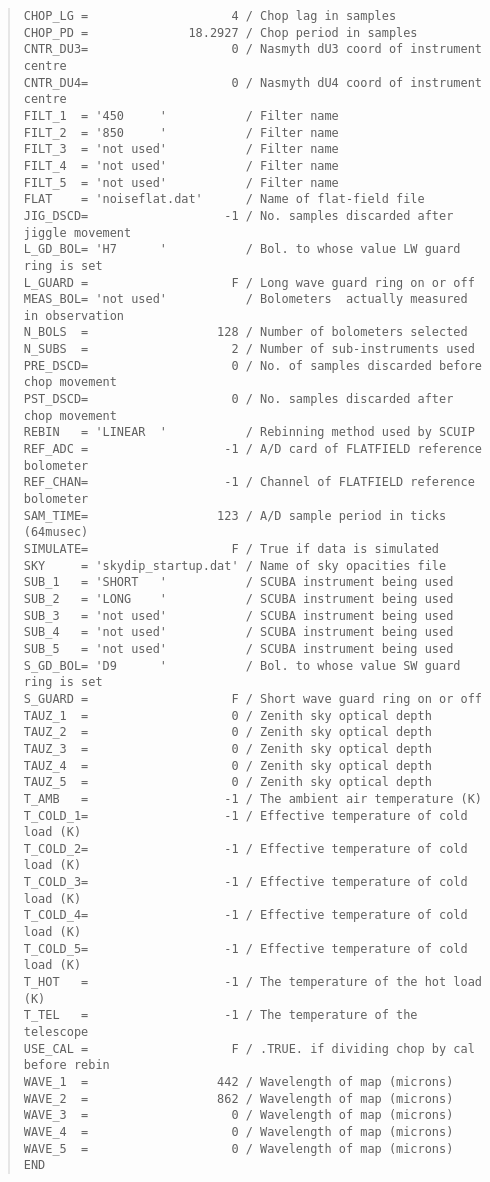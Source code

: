 \documentclass[twoside,11pt]{article}
\newenvironment{myquote}{\begin{quote}\begin{small}}{\end{small}\end{quote}}
\begin{document}
\begin{myquote}
\begin{verbatim}
CHOP_LG =                    4 / Chop lag in samples
CHOP_PD =              18.2927 / Chop period in samples
CNTR_DU3=                    0 / Nasmyth dU3 coord of instrument centre
CNTR_DU4=                    0 / Nasmyth dU4 coord of instrument centre
FILT_1  = '450     '           / Filter name
FILT_2  = '850     '           / Filter name
FILT_3  = 'not used'           / Filter name
FILT_4  = 'not used'           / Filter name
FILT_5  = 'not used'           / Filter name
FLAT    = 'noiseflat.dat'      / Name of flat-field file
JIG_DSCD=                   -1 / No. samples discarded after jiggle movement
L_GD_BOL= 'H7      '           / Bol. to whose value LW guard ring is set
L_GUARD =                    F / Long wave guard ring on or off
MEAS_BOL= 'not used'           / Bolometers  actually measured in observation
N_BOLS  =                  128 / Number of bolometers selected
N_SUBS  =                    2 / Number of sub-instruments used
PRE_DSCD=                    0 / No. of samples discarded before chop movement
PST_DSCD=                    0 / No. samples discarded after chop movement
REBIN   = 'LINEAR  '           / Rebinning method used by SCUIP
REF_ADC =                   -1 / A/D card of FLATFIELD reference bolometer
REF_CHAN=                   -1 / Channel of FLATFIELD reference bolometer
SAM_TIME=                  123 / A/D sample period in ticks (64musec)
SIMULATE=                    F / True if data is simulated
SKY     = 'skydip_startup.dat' / Name of sky opacities file
SUB_1   = 'SHORT   '           / SCUBA instrument being used
SUB_2   = 'LONG    '           / SCUBA instrument being used
SUB_3   = 'not used'           / SCUBA instrument being used
SUB_4   = 'not used'           / SCUBA instrument being used
SUB_5   = 'not used'           / SCUBA instrument being used
S_GD_BOL= 'D9      '           / Bol. to whose value SW guard ring is set
S_GUARD =                    F / Short wave guard ring on or off
TAUZ_1  =                    0 / Zenith sky optical depth
TAUZ_2  =                    0 / Zenith sky optical depth
TAUZ_3  =                    0 / Zenith sky optical depth
TAUZ_4  =                    0 / Zenith sky optical depth
TAUZ_5  =                    0 / Zenith sky optical depth
T_AMB   =                   -1 / The ambient air temperature (K)
T_COLD_1=                   -1 / Effective temperature of cold load (K)
T_COLD_2=                   -1 / Effective temperature of cold load (K)
T_COLD_3=                   -1 / Effective temperature of cold load (K)
T_COLD_4=                   -1 / Effective temperature of cold load (K)
T_COLD_5=                   -1 / Effective temperature of cold load (K)
T_HOT   =                   -1 / The temperature of the hot load (K)
T_TEL   =                   -1 / The temperature of the telescope
USE_CAL =                    F / .TRUE. if dividing chop by cal before rebin
WAVE_1  =                  442 / Wavelength of map (microns)
WAVE_2  =                  862 / Wavelength of map (microns)
WAVE_3  =                    0 / Wavelength of map (microns)
WAVE_4  =                    0 / Wavelength of map (microns)
WAVE_5  =                    0 / Wavelength of map (microns)
END
\end{verbatim}
\end{myquote}
\end{document}

